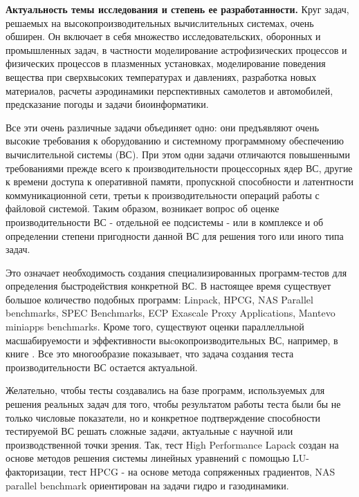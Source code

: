  \textbf{Актуальность темы исследования и степень ее
	разработанности.} Круг задач, решаемых на высокопроизводительных вычислительных системах, очень обширен. Он включает в себя множество исследовательских, оборонных и промышленных задач, в частности моделирование астрофизических процессов и физических процессов в плазменных установках, моделирование поведения вещества при сверхвысоких температурах и давлениях, разработка новых материалов, расчеты аэродинамики перспективных самолетов и автомобилей, предсказание погоды и задачи биоинформатики.

Все эти очень различные задачи объединяет одно: они предъявляют очень высокие требования к оборудованию и системному программному обеспечению вычислительной системы (ВС). При этом одни задачи  отличаются повышенными требованиями прежде всего к производительности процессорных ядер ВС, другие к времени доступа к оперативной памяти, пропускной способности и латентности коммуникационной сети, третьи к производительности операций работы с файловой системой. Таким образом, возникает вопрос об оценке производительности ВС - отдельной ее подсистемы - или в комплексе и об определении степени пригодности данной ВС для решения того или иного типа задач. 

Это означает необходимость создания специализированных программ-тестов для определения быстродействия конкретной ВС. В настоящее время существует большое количество подобных программ: Linpack, HPCG, NAS Parallel benchmarks, SPEC Benchmarks, ECP Exascale Proxy Applications, Mantevo miniapps benchmarks. Кроме того, существуют оценки параллелльной масшабируемости и эффективности выcокопроизводительных ВС, например, в книге \cite{StepanenkoScaling}.
Все это многообразие показывает, что задача создания теста производительности ВС остается актуальной.


Желательно, чтобы тесты создавались на базе программ, используемых для решения реальных задач для того, чтобы результатом работы теста были бы не только числовые показатели, но и конкретное подтверждение способности тестируемой ВС решать сложные задачи, актуальные с научной или производственной точки зрения. Так, тест High Performance Lapack создан на основе методов решения системы линейных уравнений с помощью LU-факторизации, тест HPCG - на основе метода сопряженных градиентов, NAS parallel benchmark ориентирован на задачи гидро и газодинамики.



